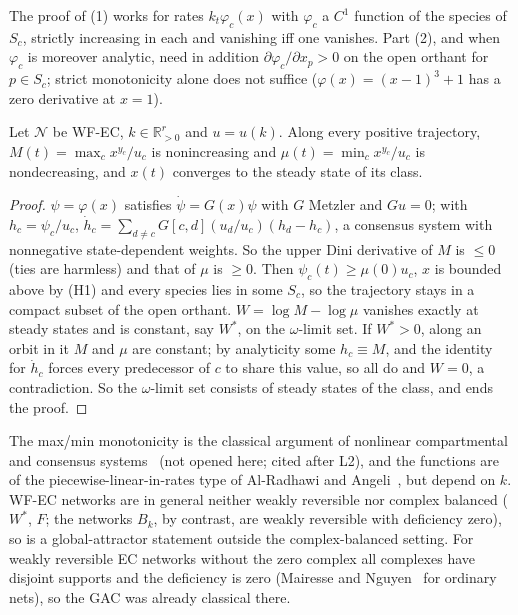 \documentclass[11pt,a4paper]{report}
\newcommand{\Net}{\mathcal{N}}
\newcommand{\Rp}{\mathbb{R}_{>0}}
\begin{document}
\begin{remark}
The proof of (1) works for rates \(k_t\varphi_c(x)\) with \(\varphi_c\) a \(C^1\) function of the species of \(S_c\),
strictly increasing in each and vanishing iff one vanishes. Part (2), and  when \(\varphi_c\) is moreover
analytic, need in addition \(\partial\varphi_c/\partial x_p>0\) on the open orthant for \(p\in S_c\); strict
monotonicity alone does not suffice (\(\varphi(x)=(x-1)^3+1\) has a zero derivative at \(x=1\)).
\end{remark}

\begin{theorem}\label{thm:GS}
Let \(\Net\) be WF-EC, \(k\in\Rp^r\) and \(u=u(k)\). Along every positive trajectory, \(M(t)=\max_cx^{y_c}/u_c\) is
nonincreasing and \(\mu(t)=\min_cx^{y_c}/u_c\) is nondecreasing, and \(x(t)\) converges to the steady state of its
class.
\end{theorem}
\begin{proof}
\(\psi=\varphi(x)\) satisfies \(\dot\psi=G(x)\psi\) with \(G\) Metzler and \(Gu=0\); with \(h_c=\psi_c/u_c\),
\(\dot h_c=\sum_{d\ne c}G[c,d](u_d/u_c)(h_d-h_c)\), a consensus system with nonnegative state-dependent weights. So the
upper Dini derivative of \(M\) is \(\le0\) (ties are harmless) and that of \(\mu\) is \(\ge0\). Then \(\psi_c(t)\ge\mu(0)u_c\),
\(x\) is bounded above by (H1) and every species lies in some \(S_c\), so the trajectory stays in a compact subset of
the open orthant. \(W=\log M-\log\mu\) vanishes exactly at steady states and is constant, say \(W^*\), on the
\(\omega\)-limit set. If \(W^*>0\), along an orbit in it \(M\) and \(\mu\) are constant; by analyticity some \(h_c\equiv
M\), and the identity for \(\dot h_c\) forces every predecessor of \(c\) to share this value, so all do and \(W=0\),
a contradiction. So the \(\omega\)-limit set consists of steady states of the class, and  ends the proof.
\end{proof}

The max/min monotonicity is the classical argument of nonlinear compartmental and consensus
systems~\autocite{MaedaKodamaOhta1978,Moreau2005} (not opened here; cited after L2), and the functions are of the
piecewise-linear-in-rates type of Al-Radhawi and Angeli~\autocite{AlRadhawiAngeli2016}, but depend on \(k\). WF-EC
networks are in general neither weakly reversible nor complex balanced (\(W^*\), \(F\); the networks \(B_k\), by
contrast, are weakly reversible with deficiency zero), so  is a
global-attractor statement outside the complex-balanced setting. For weakly reversible EC networks without the zero
complex all complexes have disjoint supports and the deficiency is zero (Mairesse and Nguyen~\autocite[Lemma~3.2,
Cor.~3.2]{MairesseNguyen2009} for ordinary nets), so the GAC was already classical there.
\end{document}

